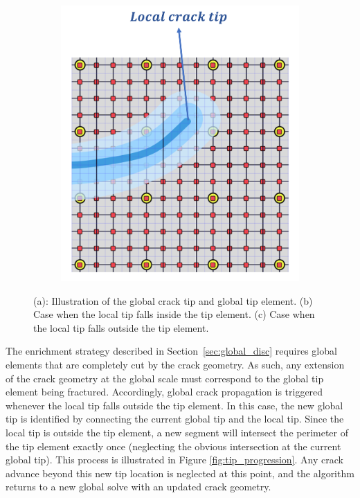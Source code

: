 \begin{figure}[!h]
\begin{subfigure}{.33\textwidth}
  \caption{}
  \label{fig:prop_items2}
\end{subfigure}
\begin{subfigure}{.33\textwidth}
  \centering
  \includegraphics[width=\linewidth]{img/Section2/propagation_items_3.png}
  \caption{}
  \label{fig:prop_items3}
\end{subfigure}
\caption{(a): Illustration of the global crack tip and global tip element. (b) Case when the local tip falls inside the tip element. (c) Case when the local tip falls outside the tip element.}
  \label{fig:all_tips}
\end{figure}

The enrichment strategy described in Section~\ref{sec:global_disc} requires global elements that are completely cut by the crack geometry.  As such, any extension of the crack geometry at the global scale must correspond to the global tip element being fractured.  Accordingly, global crack propagation is triggered whenever the local tip falls outside the tip element. In this case, the new global tip is identified by connecting the current global tip and the local tip. Since the local tip is outside the tip element, a new segment will intersect the perimeter of the tip element exactly once (neglecting the obvious intersection at the current global tip). This process is illustrated in Figure \ref{fig:tip_progression}. Any crack advance beyond this new tip location is neglected at this point, and the algorithm returns to a new global solve with an updated crack geometry.  

